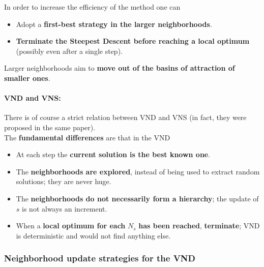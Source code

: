 In order to increase the efficiency of the method one can
\begin{itemize}
	\item Adopt a \textbf{first-best strategy in the larger neighborhoods}.\\
	
	\item \textbf{Terminate the Steepest Descent before reaching a local optimum} (possibly even after a single step).\\
	
\end{itemize}
Larger neighborhoods aim to \textbf{move out of the basins of attraction of smaller ones}.\\

\nn

\paragraph{VND and VNS:} There is of course a strict relation between VND and VNS (in fact, they were proposed in the same paper).\\

The \textbf{fundamental differences} are that in the VND
\begin{itemize}
	\item At each step the \textbf{current solution is the best known one}.\\
	
	\item The \textbf{neighborhoods are explored}, instead of being used to extract random solutions; they are never huge.\\
	
	\item The \textbf{neighborhoods do not necessarily form a hierarchy}; the update of $s$ is not always an increment.\\
	
	\item When a \textbf{local optimum for each} $N_s$ \textbf{has been reached}, \textbf{terminate}; VND is deterministic and would not find anything else.\\
\end{itemize}

\newpage

\subsubsection{Neighborhood update strategies for the VND}

